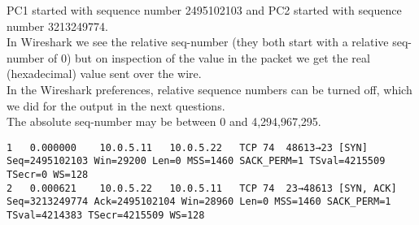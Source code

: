 PC1 started with sequence number 2495102103 and PC2 started with sequence number 3213249774. \\
In Wireshark we see the relative seq-number (they both start with a relative seq-number of 0)
but on inspection of the value in the packet we get the real (hexadecimal) value sent over the wire. \\
In the Wireshark preferences, relative sequence numbers can be turned off, which we did for the output in the next questions. \\

The absolute seq-number may be between 0 and 4,294,967,295.
\\

\begin{lstlisting}
1	0.000000	10.0.5.11	10.0.5.22	TCP	74	48613→23 [SYN] Seq=2495102103 Win=29200 Len=0 MSS=1460 SACK_PERM=1 TSval=4215509 TSecr=0 WS=128
2	0.000621	10.0.5.22	10.0.5.11	TCP	74	23→48613 [SYN, ACK] Seq=3213249774 Ack=2495102104 Win=28960 Len=0 MSS=1460 SACK_PERM=1 TSval=4214383 TSecr=4215509 WS=128
\end{lstlisting}

